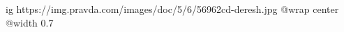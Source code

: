  
 
 
 
 

\ifcmt
  ig https://img.pravda.com/images/doc/5/6/56962cd-deresh.jpg
  @wrap center
  @width 0.7
\fi
